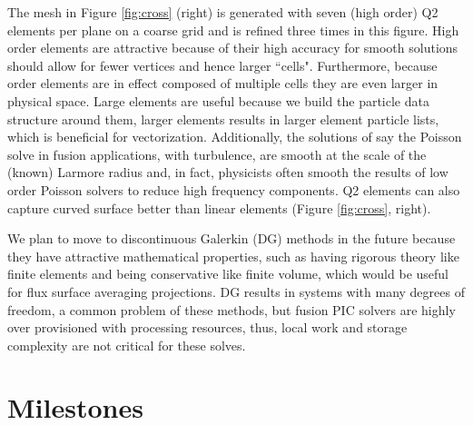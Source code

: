 \documentclass[review]{siamart}
\begin{document}
The mesh in Figure \ref{fig:cross} (right) is generated with seven (high order) Q2 elements per plane on a coarse grid and is refined three times in this figure.
High order elements are attractive because of their high accuracy for smooth solutions should allow for fewer vertices and hence larger ``cells".
Furthermore, because order elements are in effect composed of multiple cells they are even larger in physical space.
Large elements are useful because we build the particle data structure around them, larger elements results in larger element particle lists, which is beneficial for vectorization.
Additionally, the solutions of say the Poisson solve in fusion applications, with turbulence, are smooth at the scale of the (known) Larmore radius and, in fact, physicists often smooth the results of low order Poisson solvers to reduce high frequency components.
Q2 elements can also capture curved surface better than linear elements (Figure \ref{fig:cross}, right).

We plan to move to discontinuous Galerkin (DG) methods in the future because they have attractive mathematical properties, such as having rigorous theory like finite elements and being conservative like finite volume, which would be useful for flux surface averaging projections.
DG results in systems with many degrees of freedom, a common problem of these methods, but fusion PIC solvers are highly over provisioned with processing resources, thus, local work and storage complexity are not critical for these solves.

\section{Milestones}
\label{sec:mile}
\end{document}
